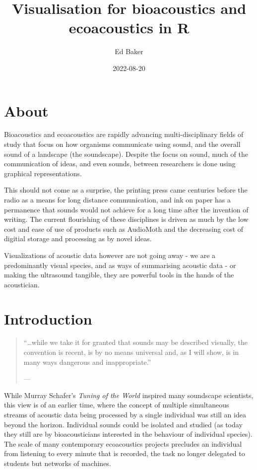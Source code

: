 \documentclass[
]{book}
\title{Visualisation for bioacoustics and ecoacoustics in R}
\author{Ed Baker}
\date{2022-08-20}
\begin{document}
\maketitle

{
\setcounter{tocdepth}{1}
\tableofcontents
}
\hypertarget{about}{%
\chapter*{About}\label{about}}

Bioacoustics and ecoacoustics are rapidly advancing multi-disciplinary fields of study that focus on how organisms communicate using sound, and the overall sound of a landscape (the soundscape). Despite the focus on sound, much of the communication of ideas, and even sounds, between researchers is done using graphical representations.

This should not come as a surprise, the printing press came centuries before the radio as a means for long distance communication, and ink on paper has a permanence that sounds would not achieve for a long time after the invention of writing. The current flourishing of these disciplines is driven as much by the low cost and ease of use of products such as AudioMoth and the decreasing cost of digitial storage and processing as by novel ideas.

Visualizations of acoustic data however are not going away - we are a predominantly visual species, and as ways of summarising acoustic data - or making the ultrasound tangible, they are powerful tools in the hands of the acoustician.

\hypertarget{intro}{%
\chapter{Introduction}\label{intro}}

\begin{quote}
``\ldots while we take it for granted that sounds may be described visually, the convention is recent, is by no means universal and, as I will show, is in many ways dangerous and inappropriate.''

\hfill --- \citet{schafer1977}
\end{quote}

While Murray Schafer's \emph{Tuning of the World} \citep{schafer1977} inspired many soundscape scientists, this view is of an earlier time, where the concept of multiple simultaneous streams of acoustic data being processed by a single individual was still an idea beyond the horizon. Individual sounds could be isolated and studied (as today they still are by bioacousticians interested in the behaviour of individual species). The scale of many contemporary ecoacoustics projects precludes an individual from listening to every minute that is recorded, the task no longer delegated to students but networks of machines.
\end{document}
